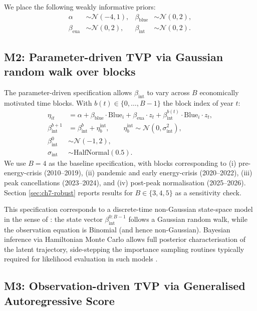 \documentclass[11pt,a4paper]{article}
\newcommand{\bint}{\beta_{\mathrm{int}}}
\newcommand{\bblue}{\beta_{\mathrm{blue}}}
\newcommand{\beua}{\beta_{\mathrm{eua}}}
\begin{document}
We place the following weakly informative priors:
\begin{align}
\alpha &\sim \mathcal{N}(-4, 1), &
\bblue &\sim \mathcal{N}(0, 2), \\
\beua &\sim \mathcal{N}(0, 2), &
\bint &\sim \mathcal{N}(0, 2).
\end{align}

\subsection{M2: Parameter-driven TVP via Gaussian random walk over blocks}

The parameter-driven specification allows $\bint$ to vary across $B$ economically motivated time blocks. With $b(t) \in \{0, \dots, B-1\}$ the block index of year $t$:
\begin{align}
\eta_{it} &= \alpha + \bblue \cdot \mathrm{Blue}_i + \beua \cdot z_t + \bint^{b(t)} \cdot \mathrm{Blue}_i \cdot z_t, \\
\bint^{b+1} &= \bint^{b} + \eta_b^{\mathrm{int}}, \qquad \eta_b^{\mathrm{int}} \sim \mathcal{N}(0, \sigma^2_{\mathrm{int}}), \\
\bint^{0} &\sim \mathcal{N}(-1, 2), \\
\sigma_{\mathrm{int}} &\sim \mathrm{HalfNormal}(0.5).
\end{align}
We use $B = 4$ as the baseline specification, with blocks corresponding to (i) pre-energy-crisis (2010--2019), (ii) pandemic and early energy-crisis (2020--2022), (iii) peak cancellations (2023--2024), and (iv) post-peak normalisation (2025--2026). Section \ref{sec:ch7-robust} reports results for $B \in \{3, 4, 5\}$ as a sensitivity check.

This specification corresponds to a discrete-time non-Gaussian state-space model in the sense of \citet{durbin2012time}: the state vector $\bint^{0:B-1}$ follows a Gaussian random walk, while the observation equation is Binomial (and hence non-Gaussian). Bayesian inference via Hamiltonian Monte Carlo allows full posterior characterisation of the latent trajectory, side-stepping the importance sampling routines typically required for likelihood evaluation in such models \citep[Chapter 11]{durbin2012time}.

\subsection{M3: Observation-driven TVP via Generalised Autoregressive Score}
\end{document}
